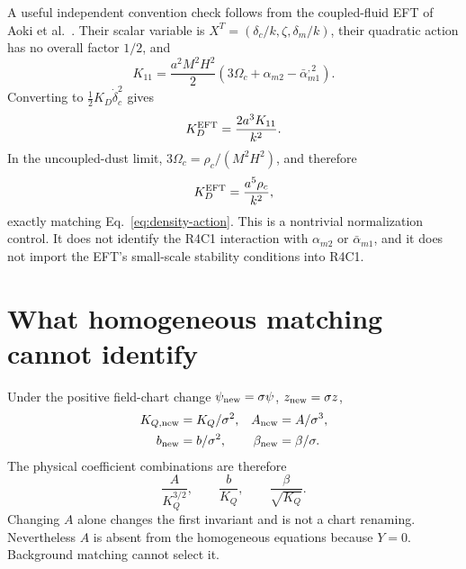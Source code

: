 \documentclass[aps,prd,reprint,superscriptaddress,nofootinbib,floatfix]{revtex4-2}
\begin{document}
A useful independent convention check follows from the coupled-fluid EFT of
Aoki et al.~\cite{aoki2025}.  Their scalar variable is
\(X^T=(\delta_c/k,\zeta,\delta_m/k)\), their quadratic action has no overall
factor \(1/2\), and
\begin{equation}
 K_{11}=\frac{a^2M^2H^2}{2}
 \left(3\Omega_c+\alpha_{m2}-\bar\alpha_{m1}^{,2}\right).
\end{equation}
Converting to \(\tfrac12K_D\dot\delta_c^2\) gives
\begin{equation}
 K_D^{\rm EFT}=\frac{2a^3K_{11}}{k^2}.
\end{equation}
In the uncoupled-dust limit,
\(3\Omega_c=\rho_c/(M^2H^2)\), and therefore
\begin{equation}
 K_D^{\rm EFT}=\frac{a^5\rho_c}{k^2},
 \label{eq:aoki-match}
\end{equation}
exactly matching Eq.~\eqref{eq:density-action}.  This is a nontrivial
normalization control.  It does not identify the R4C1 interaction with
\(\alpha_{m2}\) or \(\bar\alpha_{m1}\), and it does not import the EFT's
small-scale stability conditions into R4C1.

\section{What homogeneous matching cannot identify}
\label{sec:identifiability}

Under the positive field-chart change
\(\psi_{\rm new}=\sigma\psi\), \(z_{\rm new}=\sigma z\),
\begin{align}
 K_{Q,\rm new}&=K_Q/\sigma^2,&
 A_{\rm new}&=A/\sigma^3,\\
 b_{\rm new}&=b/\sigma^2,&
 \beta_{\rm new}&=\beta/\sigma .
\end{align}
The physical coefficient combinations are therefore
\begin{equation}
 \frac{A}{K_Q^{3/2}},\qquad
 \frac{b}{K_Q},\qquad
 \frac{\beta}{\sqrt{K_Q}}.
 \label{eq:invariants}
\end{equation}
Changing \(A\) alone changes the first invariant and is not a chart
renaming.  Nevertheless \(A\) is absent from the homogeneous equations because
\(Y=0\).  Background matching cannot select it.
\end{document}
